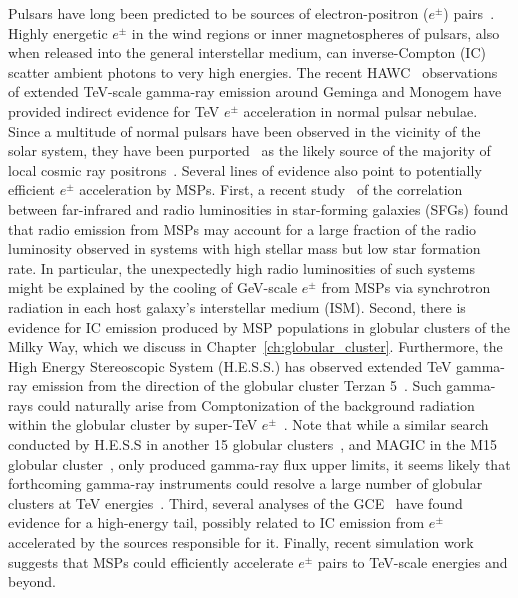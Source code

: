 \documentclass[doublespace,nopageskip]{VTthesis}
\begin{document}
Pulsars have long been predicted to be sources of electron-positron ($e^{\pm}$) pairs~\citep{1966RvMP...38..626E,1970Natur.227..465S,1971ApJ...164..529S, 1995A&A...294L..41A, 1995PhRvD..52.3265A}. Highly energetic $e^{\pm}$ in the wind regions or inner magnetospheres of pulsars, 
also when released into the general interstellar medium,
can inverse-Compton (IC) scatter ambient photons to very high energies. 
The recent HAWC~\citep{2017Sci...358..911A} observations of extended TeV-scale gamma-ray emission around Geminga and Monogem have provided indirect evidence for TeV $e^{\pm}$ acceleration in normal pulsar nebulae.  Since a multitude of normal pulsars have been observed in the vicinity of the solar system, they have been purported~\citep{2009JCAP...01..025H, 2010A&A...524A..51D,2017Sci...358..911A,2017PhRvD..96j3013H, 2018PhRvD..97l3008P,2019PhRvD.100l3015D, 2019ApJ...879...91J} as the likely source of the majority of local cosmic ray positrons~\citep{2013PhRvL.110n1102A}.    
Several lines of evidence also point to potentially efficient $e^{\pm}$ acceleration by MSPs. First, a recent study~\citep{2021PhRvD.103h3017S} of the correlation between far-infrared and radio luminosities in star-forming galaxies (SFGs) found that radio emission from MSPs may account for a large fraction of the radio luminosity observed in systems with high stellar mass but low star formation rate. 
%
In particular, the unexpectedly high radio luminosities of such
systems
might be explained by the cooling of GeV-scale $e^{\pm}$ from MSPs via synchrotron radiation in each host galaxy's interstellar medium (ISM). 
Second, there is evidence for IC emission produced by MSP populations in globular clusters of the Milky Way, which we discuss in Chapter~\ref{ch:globular_cluster}. Furthermore, the High Energy Stereoscopic System (H.E.S.S.) has observed extended TeV gamma-ray emission from the direction of the globular cluster Terzan 5~\citep{2013A&A...551A..26H}. Such gamma-rays could naturally arise from Comptonization of the background radiation within the globular cluster by super-TeV $e^{\pm}$~\citep{2016MNRAS.458.1083B}. 
%
Note that while a similar search conducted by H.E.S.S in another 15 globular clusters~\citep{2013A&A...551A..26H}, and MAGIC in the M15 globular cluster~\citep{2019MNRAS.484.2876M}, only produced gamma-ray flux upper limits, it seems likely that forthcoming gamma-ray instruments could resolve a large number of globular clusters at TeV energies~\citep{2018MNRAS.473..897N,2021MNRAS.500.4827N}. 
Third, several analyses of the GCE~\citep[e.g.,][]{2016JCAP...11..053H,2016PhRvD..94j3013L,2021PhRvD.103f3029D} have found evidence for a high-energy tail, possibly related to IC emission from $e^\pm$ accelerated by the sources responsible for it. 
%
Finally, recent simulation work \citep{2020A&A...635A.138G} suggests that MSPs could efficiently accelerate $e^{\pm}$ pairs to TeV-scale energies and beyond. 
\end{document}
